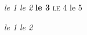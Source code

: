 \documentclass[11pt]{article}
\begin{document}
\textsl{le 1\ier} \textit{le 2} \textbf{le 3} \textsc{le 4} le 5

{\large \textsl{le 1\ier} \textit{le 2}}
\end{document}
